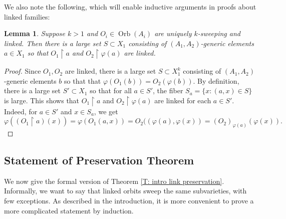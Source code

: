 \documentclass{amsart}
\newtheorem{lemma}[theorem]{Lemma}
\theoremstyle{definition}
\newcommand{\tp}{\operatorname{tp}}
\begin{document}

We also note the following, which will enable inductive arguments in proofs about linked families:

\begin{lemma}\label{L: linked restriction}
    Suppose $k>1$ and $O_i\in\operatorname{Orb}(A_i)$ are uniquely $k$-sweeping and linked. Then there is a large set $S\subset X_1$ consisting of $(A_1,A_2)$-generic elements $a\in X_1$ so that $O_1\restriction a$ and $O_2\restriction\varphi(a)$ are linked. 
\end{lemma}
\begin{proof}
    Since $O_1,O_2$ are linked, there is a large set $S\subset X_1^k$ consisting of $(A_1,A_2)$-generic elements $b$ so that that $\varphi(O_1(b))=O_2(\varphi(b))$. By definition, there is a large set $S'\subset X_1$ so that for all $a\in S'$, the fiber $S_a=\{x:(a,x)\in S\}$ is large. This shows that $O_1\restriction a$ and $O_2\restriction\varphi(a)$ are linked for each $a\in S'$. Indeed, for $a\in S'$ and $x\in S_a$, we get $$\varphi((O_1\restriction a)(x))=\varphi(O_1(a,x))=O_2((\varphi(a),\varphi(x))=(O_2)_{\varphi(a)}(\varphi(x)).$$
\end{proof}

   

\subsection{Statement of Preservation Theorem} We now give the formal version of Theorem \ref{T: intro link preservation}. Informally, we want to say that linked orbits sweep the same subvarieties, with few exceptions. As described in the introduction, it is more convenient to prove a more complicated statement by induction.
\end{document}
